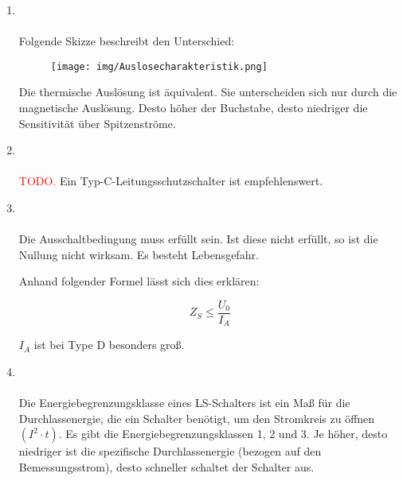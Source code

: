 \begin{enumerate}
    \item   {} \\\\
            Folgende Skizze beschreibt den Unterschied:

            \begin{figure}[!htp]
                \centering
                \texttt{[image: img/Auslosecharakteristik.png]}
            \end{figure}

            Die thermische Auslösung ist äquivalent. Sie unterscheiden sich nur durch die magnetische Auslösung.
            Desto höher der Buchstabe, desto niedriger die Sensitivität über Spitzenströme.

    \clearpage

    \item   {} \\\\
            \textcolor{red}{TODO.} Ein Typ-C-Leitungsschutzschalter ist empfehlenswert.

    \item   {} \\\\
            Die Ausschaltbedingung muss erfüllt sein. Ist diese nicht erfüllt, so ist die Nullung nicht wirksam. Es besteht Lebensgefahr.

            Anhand folgender Formel lässt sich dies erklären:

            $$Z_S \le \frac{U_0}{I_A}$$

            $I_A$ ist bei Type D besonders groß. 

    \item   {} \\\\
            Die Energiebegrenzungsklasse eines LS-Schalters ist ein Maß für die Durchlassenergie, die ein Schalter benötigt, um den Stromkreis zu öffnen $\left(I^2\cdot t\right)$.
            Es gibt die Energiebegrenzungsklassen 1, 2 und 3. Je höher, desto niedriger ist die spezifische Durchlassenergie (bezogen auf den Bemessungsstrom), desto schneller schaltet der Schalter aus.         
\end{enumerate}

